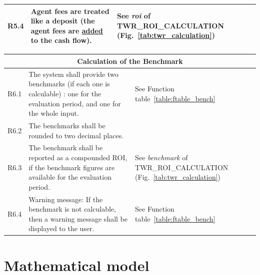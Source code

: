 \documentclass[runningheads,12pt]{article}
\begin{document}
{\begin{longtable}{|l|p{9cm}|p{5cm}|}
\hline
R5.4 & Agent fees are treated like a deposit (the agent fees are \underline{added} to the cash flow). & See \textit{roi} of TWR\_ROI\_CALCULATION (Fig.~\ref{tab:twr_calculation})\\

\hline
\end{longtable}
\centering
\begin{longtable}{|l|p{9cm}|p{5cm}|}

\hline
\multicolumn{3}{|c|}{\textbf{Calculation of the Benchmark}} \\

\hline
R6.1 & The system shall provide two benchmarks (if each one is calculable) : one for the evaluation period, and one for the whole input. & See Function table~\ref{table:ftable_bench}\\

\hline
R6.2 &  The benchmarks shall be rounded to two decimal places. & \\

\hline
R6.3 & The benchmark shall be reported as a compounded ROI, if the benchmark figures are available for the evaluation period. & See \textit{benchmark} of TWR\_ROI\_CALCULATION (Fig.~\ref{tab:twr_calculation})\\

\hline
R6.4 & Warning message: If the benchmark is not calculable, then a warning message shall be displayed to the user. & See Function table~\ref{table:ftable_bench}\\



\hline
\end{longtable}
}

\newpage

\section{Mathematical model}
\end{document}
